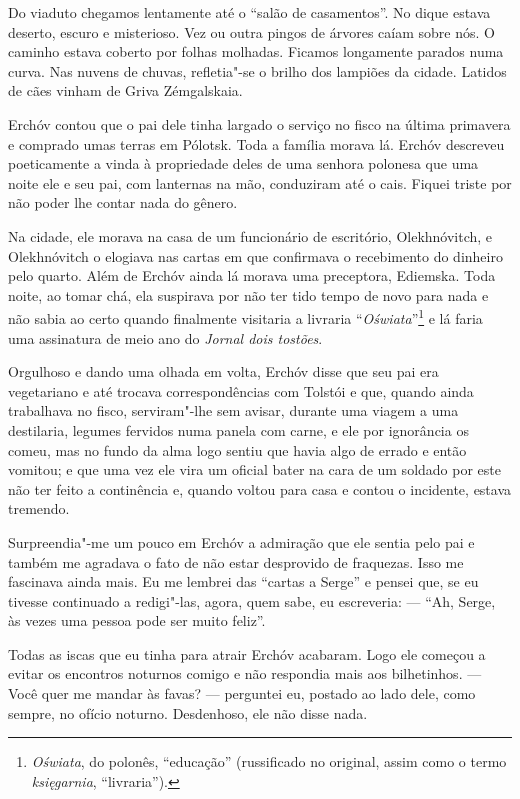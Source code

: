 Do viaduto chegamos lentamente até o ``salão de casamentos''. No dique
estava deserto, escuro e misterioso. Vez ou outra pingos de árvores
caíam sobre nós. O caminho estava coberto por folhas molhadas. Ficamos
longamente parados numa curva. Nas nuvens de chuvas, refletia"-se o
brilho dos lampiões da cidade. Latidos de cães vinham de Griva
Zémgalskaia.

Erchóv contou que o pai dele tinha largado o serviço no fisco na última
primavera e comprado umas terras em Pólotsk. Toda a família morava lá.
Erchóv descreveu poeticamente a vinda à propriedade deles de uma senhora
polonesa que uma noite ele e seu pai, com lanternas na mão, conduziram
até o cais. Fiquei triste por não poder lhe contar nada do gênero.

Na cidade, ele morava na casa de um funcionário de escritório,
Olekhnóvitch, e Olekhnóvitch o elogiava nas cartas em que confirmava o
recebimento do dinheiro pelo quarto. Além de Erchóv ainda lá morava uma
preceptora, Ediemska. Toda noite, ao tomar chá, ela suspirava por não
ter tido tempo de novo para nada e não sabia ao certo quando finalmente
visitaria a livraria ``\emph{Oświata}''\footnote{\emph{Oświata}, do
  polonês, ``educação'' (russificado no original, assim como o termo
  \emph{księgarnia}, ``livraria'').} e lá faria uma assinatura de meio
ano do \emph{Jornal dois tostões}.

Orgulhoso e dando uma olhada em volta, Erchóv disse que seu pai era
vegetariano e até trocava correspondências com Tolstói e que, quando
ainda trabalhava no fisco, serviram"-lhe sem avisar, durante uma viagem a
uma destilaria, legumes fervidos numa panela com carne, e ele por
ignorância os comeu, mas no fundo da alma logo sentiu que havia algo de
errado e então vomitou; e que uma vez ele vira um oficial bater na cara
de um soldado por este não ter feito a continência e, quando voltou para
casa e contou o incidente, estava tremendo.

Surpreendia"-me um pouco em Erchóv a admiração que ele sentia pelo pai e
também me agradava o fato de não estar desprovido de fraquezas. Isso me
fascinava ainda mais. Eu me lembrei das ``cartas a Serge'' e pensei que,
se eu tivesse continuado a redigi"-las, agora, quem sabe, eu escreveria:
--- ``Ah, Serge, às vezes uma pessoa pode ser muito feliz''.

Todas as iscas que eu tinha para atrair Erchóv acabaram. Logo ele
começou a evitar os encontros noturnos comigo e não respondia mais aos
bilhetinhos. --- Você quer me mandar às favas? --- perguntei eu, postado
ao lado dele, como sempre, no ofício noturno. Desdenhoso, ele não disse
nada.

